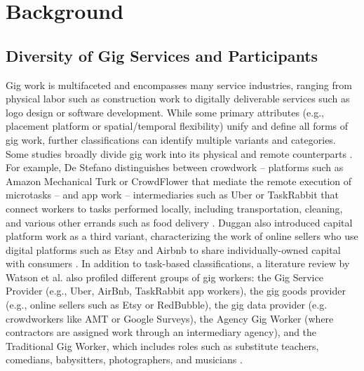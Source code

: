 \section{Background}
\subsection{Diversity of Gig Services and Participants}
Gig work is multifaceted and encompasses many service industries, ranging from physical labor such as construction work to digitally deliverable services such as logo design or software development. While some primary attributes (e.g., placement platform or spatial/temporal flexibility) unify and define all forms of gig work, further classifications can identify multiple variants and categories. Some studies broadly divide gig work into its physical and remote counterparts \cite{Fauzi2022-vd,personal}. For example, De Stefano distinguishes between crowdwork – platforms such as Amazon Mechanical Turk or CrowdFlower that mediate the remote execution of microtasks – and app work – intermediaries such as Uber or TaskRabbit that connect workers to tasks performed locally, including transportation, cleaning, and various other errands such as food delivery \cite{Stefano_undated-dw}. Duggan also introduced capital platform work as a third variant, characterizing the work of online sellers who use digital platforms such as Etsy and Airbnb to share individually-owned capital with consumers \cite{Duggan2020-qh,Maffie2020-ap}. In addition to task-based classifications, a literature review by Watson et al. also profiled different groups of gig workers: the Gig Service Provider (e.g., Uber, AirBnb, TaskRabbit app workers), the gig goods provider (e.g., online sellers such as Etsy or RedBubble), the gig data provider (e.g. crowdworkers like AMT or Google Surveys), the Agency Gig Worker (where contractors are assigned work through an intermediary agency), and the Traditional Gig Worker, which includes roles such as substitute teachers, comedians, babysitters, photographers, and musicians \cite{Watson2021-kr}.

